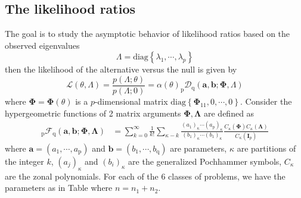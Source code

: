 \documentclass[twoside]{article}
\begin{document}
\subsection{The likelihood ratios} The goal is to study the asymptotic behavior of likelihood ratios based on the observed eigenvalues 
$$
\Lambda = \mathrm{diag}\left\{ \lambda_1,\cdots,\lambda_p \right\}
$$
then the likelihood of the alternative versus the null is given by 
\begin{equation}\label{eq:likelihood_ratio}
    \mathcal{L}(\theta,\Lambda) = \frac{p(\Lambda;\theta)}{p(\Lambda;0)} = \alpha(\theta) _{\mathrm{p}}\mathcal{D}_{\mathrm{q}}(\mathbf{a,b};\boldsymbol{\Phi},\Lambda)
\end{equation}
where $\boldsymbol{\Phi}=\boldsymbol{\Phi}(\theta)$ is a $p$-dimensional matrix $\mathrm{diag}\left\{ \boldsymbol{\Phi}_{11},0,\cdots,0 \right\}$. Consider the hypergeometric functions of 2 matrix arguments $\boldsymbol{\Phi,\Lambda}$ are defined as 
\begin{align*}
    _{\mathrm{p}}\mathcal{F}_{\mathrm{q}}(\mathbf{a,b};\boldsymbol{\Phi,\Lambda}) &= \sum^{\infty}_{k=0} \frac{1}{k!}\sum_{\kappa-k}\frac{\left(a_1\right)_{\kappa}\cdots\left(a_{\mathrm{p}}\right)_{\kappa}}{\left(b_1\right)_{\kappa}\cdots\left(b_{\mathrm{1}}\right)_{\kappa}}\frac{C_{\kappa}(\boldsymbol{\Phi})C_{\kappa}(\boldsymbol{\Lambda})}{C_{\kappa}(\mathbf{I}_p)}
\end{align*}
where $\mathbf{a}=\left( a_1,\cdots,a_{\mathrm{p}} \right)$ and $\mathbf{b}=\left( b_1,\cdots,b_{\mathrm{q}} \right)$ are parameters, $\kappa$ are partitions of the integer $k$, $(a_j)_{\kappa}$ and $(b_i)_{\kappa}$ are the generalized Pochhammer symbols, $C_{\kappa}$ are the zonal polynomials. For each of the 6 classes of problems, we have the parameters as in Table  where $n = n_1+n_2 $.
\end{document}
